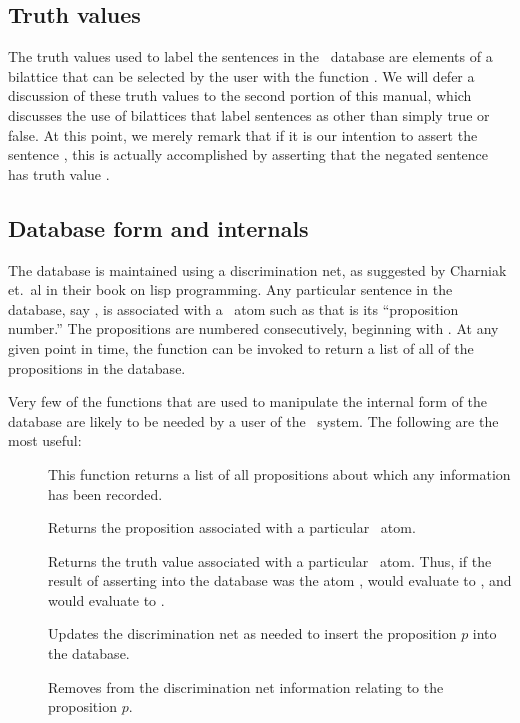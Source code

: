 \subsection{Truth values}

The truth values used to label the sentences in the \mvl\ database
are elements of a bilattice that can be selected by the user with
the function .  We will defer a discussion of these
truth values to the second portion of this manual, which discusses
the use of bilattices that label sentences as other than simply true
or false.  At this point, we merely remark that if it is our intention
to assert the sentence , this is actually accomplished
by asserting that the negated sentence  has truth value
.

\subsection{Database form and internals}
\label{s.database}

The database is maintained using a discrimination net, as suggested
by Charniak et.~al in their book on {\sc lisp} programming.  Any
particular sentence in the database, say , is
associated with a \lisp\ atom such as  that is its
``proposition number.''  The propositions are numbered consecutively,
beginning with .  At any given point in time, the function
 can be invoked to return a list of all of the
propositions in the database.

Very few of the functions that are used to manipulate the internal form
of the database are likely to be needed by a user of the \mvl\ system.  The
following are the most useful:
 \begin{description}
 \item [] This function returns a list of all
propositions about which any information has been recorded.
 \item [] Returns the proposition associated with a
particular \lisp\ atom.
 \item [] Returns the truth value associated
with a particular \lisp\ atom.  Thus, if the result of asserting
 into the database was the atom ,
 would evaluate to , and
 would evaluate to . 
 \item [] Updates the discrimination net as
needed to insert the proposition $p$ into the database.
 \item [] Removes from the discrimination net
information relating to the proposition $p$.
 \end{description}

